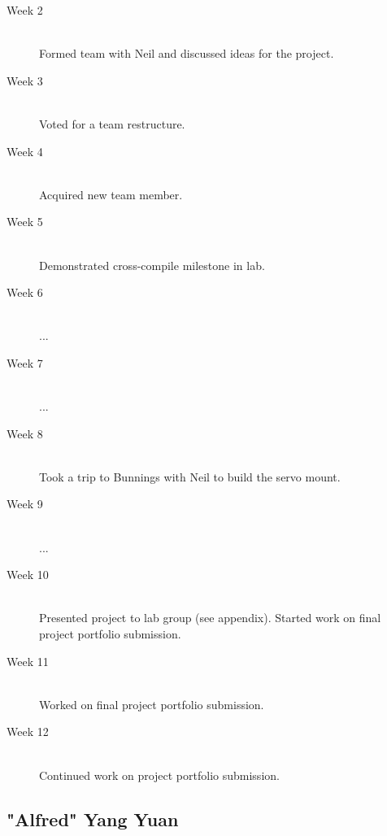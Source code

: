 \documentclass[11pt,a4paper,titlepage]{report}
\begin{document}
\begin{description}

  \item[Week 2] \hfill \\
      Formed team with Neil and discussed ideas for the project.
  \item[Week 3] \hfill \\
      Voted for a team restructure.
  \item[Week 4] \hfill \\
      Acquired new team member.
  \item[Week 5] \hfill \\
      Demonstrated cross-compile milestone in lab.
  \item[Week 6] \hfill \\
      ...
  \item[Week 7] \hfill \\
      ...
  \item[Week 8] \hfill \\
      Took a trip to Bunnings with Neil to build the servo mount.
  \item[Week 9] \hfill \\
      ...
  \item[Week 10] \hfill \\
      Presented project to lab group (see appendix). Started work on final project portfolio submission.
  \item[Week 11] \hfill \\
      Worked on final project portfolio submission.
  \item[Week 12] \hfill \\
      Continued work on project portfolio submission.

\end{description}


\subsection{"Alfred" Yang Yuan}
\end{document}
